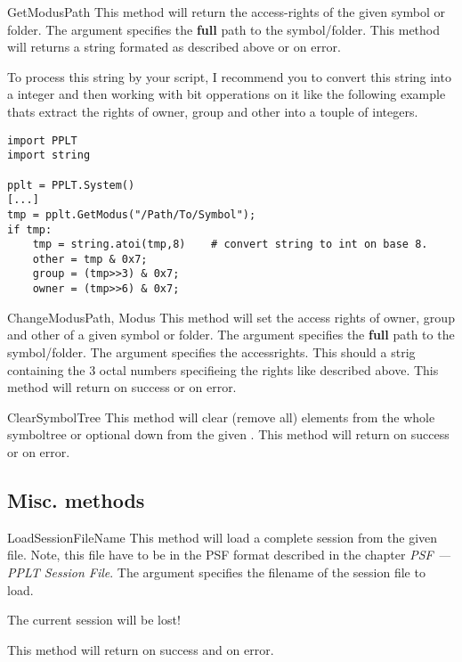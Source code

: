 \begin{methoddesc}[System]{GetModus}{Path}
This method will return the access-rights of the given symbol or folder.
The argument  specifies the \textbf{full} path to the symbol/folder.
This method will returns a string formated as described above or 
on error. 

To process this string by your script, I recommend you to convert this string 
into a integer and then working with bit opperations on it like the following 
example thats extract the rights of owner, group and other into a touple of 
integers.
\begin{verbatim}
import PPLT
import string

pplt = PPLT.System()
[...]
tmp = pplt.GetModus("/Path/To/Symbol");
if tmp:
    tmp = string.atoi(tmp,8)    # convert string to int on base 8.
    other = tmp & 0x7;
    group = (tmp>>3) & 0x7;
    owner = (tmp>>6) & 0x7;
\end{verbatim}    
\end{methoddesc}


\begin{methoddesc}[System]{ChangeModus}{Path, Modus}
This method will set the access rights of owner, group and other
of a given symbol or folder. The argument  specifies the 
\textbf{full} path to the symbol/folder. The argument  specifies
the accessrights. This should a strig containing the 3 octal numbers 
specifieing the rights like described above. This method will return 
 on success or  on error.
\end{methoddesc}


\begin{methoddesc}[System]{ClearSymbolTree}{}
This method will clear (remove all) elements from the whole symboltree or
optional down from the given . This method will return 
 on success or  on error.
\end{methoddesc}




\subsection{Misc. methods}
\begin{methoddesc}[System]{LoadSession}{FileName}
This method will load a complete session from the given file. Note, this file
have to be in the PSF format described in the chapter 
\emph{PSF --- PPLT Session File}. The argument  specifies the
filename of the session file to load.
\begin{notice} 
The current session will be lost! 
\end{notice}
This method will return  on success and  on error.
\end{methoddesc}


